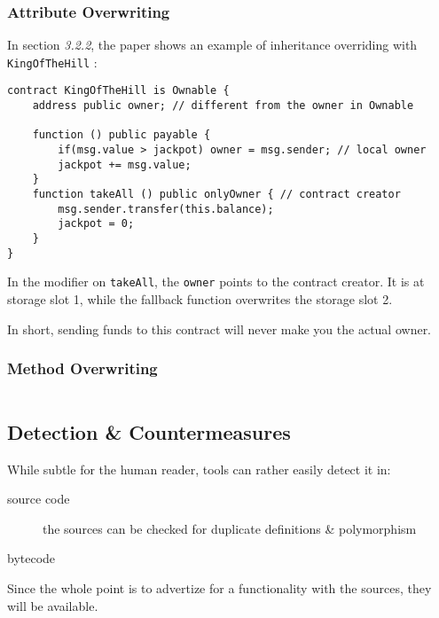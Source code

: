 \subsubsection{Attribute Overwriting}

In section \emph{3.2.2}, the paper \cite{paper-art-of-the-scam} shows an example of inheritance overriding with \lstinline{KingOfTheHill} :

\begin{lstlisting}[language=Solidity]
contract KingOfTheHill is Ownable {
    address public owner; // different from the owner in Ownable

    function () public payable {
        if(msg.value > jackpot) owner = msg.sender; // local owner
        jackpot += msg.value;
    }
    function takeAll () public onlyOwner { // contract creator
        msg.sender.transfer(this.balance);
        jackpot = 0;
    }
}
\end{lstlisting}

In the modifier on \lstinline{takeAll}, the \lstinline{owner} points to the contract creator.
It is at storage slot 1, while the fallback function overwrites the storage slot 2.

In short, sending funds to this contract will never make you the actual owner.

\subsubsection{Method Overwriting}

\begin{lstlisting}[language=Solidity]

\end{lstlisting}

\subsection{Detection \& Countermeasures}

While subtle for the human reader, tools can rather easily detect it in:

\begin{description}
\item[source code]{the sources can be checked for duplicate definitions \& polymorphism}
\item[bytecode]{}
\end{description}

Since the whole point is to advertize for a functionality with the sources, they will be available.
